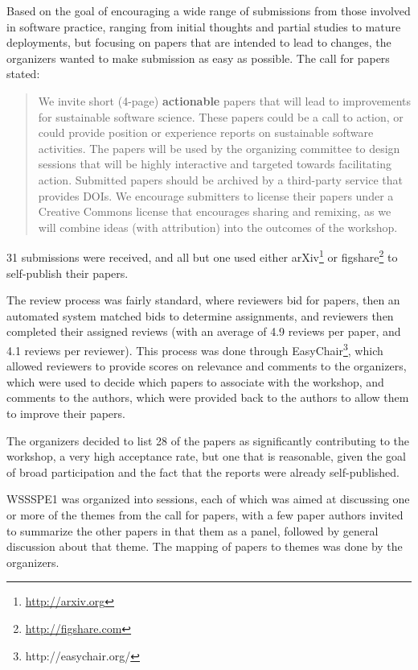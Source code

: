 \documentclass[11pt, oneside]{amsart}
\begin{document}
Based on the goal of encouraging a wide range of submissions from those involved
in software practice, ranging from initial thoughts and partial studies to
mature deployments, but focusing on papers that are intended to lead to changes,
the organizers wanted to make submission as easy as possible. The call for
papers stated:

\begin{quote}
We invite short (4-page) \textbf{actionable} papers that will lead to
improvements for sustainable software science. These papers could be a call to
action, or could provide position or experience reports on sustainable software
activities. The papers will be used by the organizing committee to design
sessions that will be highly interactive and targeted towards facilitating
action. Submitted papers should be archived by a third-party service that
provides DOIs. We encourage submitters to license their papers under a Creative
Commons license that encourages sharing and remixing, as we will combine ideas
(with attribution) into the outcomes of the workshop.
\end{quote}

31 submissions were received, and all but one used either
arXiv\footnote{\url{http://arxiv.org}} or
figshare\footnote{\url{http://figshare.com}} to self-publish their papers.

The review process was fairly standard, where reviewers bid for papers, then an
automated system
matched bids to determine assignments, and reviewers then completed their
assigned
reviews (with an average of 4.9 reviews per paper, and 4.1 reviews per
reviewer).
This process was done through EasyChair\footnote{http://easychair.org/}, which
allowed reviewers to provide scores on relevance and comments to the organizers,
which were used to decide which papers to associate with the workshop, and
comments to the authors, which were provided back to the authors to allow them
to improve their papers.

The organizers decided to list 28 of the papers as significantly contributing to
the workshop, a very high acceptance rate, but one that is reasonable, given the
goal of broad participation and the fact that the reports were already
self-published.

WSSSPE1 was organized into sessions, each of which was aimed at discussing one
or more of the themes from the call for papers, with a few paper authors invited
to summarize the other papers in that them as a panel, followed by general
discussion about that theme. The mapping of papers to themes was done by the
organizers.
\end{document}
